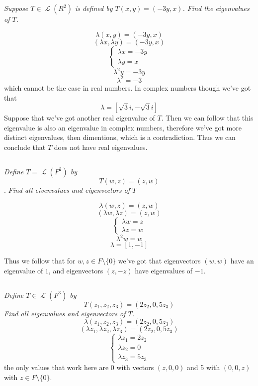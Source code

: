 \documentclass[11pt,oneside,titlepage]{book}
\DeclareMathOperator \map {\mathcal {L}}
\begin{document}
\subsection{}

\textit{Suppose $T \in \map(R^2)$ is defined by $T(x, y) = (-3y, x)$. Find the eigenvalues
  of $T$.}

$$\lambda (x, y) = (-3y, x)$$
$$ (\lambda x, \lambda y) = (-3y, x)$$
$$
\begin{cases}
  \lambda x = -3y \\
  \lambda y = x
\end{cases}
$$
$$\lambda^2 y = -3y $$
$$\lambda^2  = -3 $$
which cannot be the case in real numbers. In complex numbers though we've got that
$$\lambda = [\sqrt{3}i, -\sqrt{3}i]$$
Suppose that we've got another real eigenvalue of $T$. Then we can follow that this
eigenvalue is also an eigenvalue in complex numbers, therefore we've got more distinct eigenvalues,
then dimentions, which is a contradiction. Thus we can conclude that $T$ does not
have real eigenvalues.

\subsection{}

\textit{Define $T = \map(F^2)$ by}
$$T(w, z) = (z, w)$$.
\textit{Find all eivenvalues and eigenvectors of $T$}

$$\lambda (w, z) = (z, w)$$
$$ (\lambda w, \lambda z) = (z, w)$$
$$
\begin{cases}
  \lambda w = z \\
  \lambda z = w
\end{cases}
$$
$$\lambda^2 w = w$$
$$\lambda = [1, -1]$$

Thus we follow that for $w, z \in F \setminus \{0\}$ we've got
that eigenvectors $(w, w)$ have an eigenvalue of $1$, and eigenvectors $(z, -z)$ have eigenvalues
of $-1$.

\subsection{}

\textit{Define $T \in \map(F^3)$ by}
$$T(z_1, z_2, z_3) = (2z_2, 0, 5z_3)$$
\textit{Find all eigenvalues and eigenvectors of $T$.}
$$\lambda (z_1, z_2, z_3) = (2z_2, 0, 5z_3)$$
$$ (\lambda z_1, \lambda z_2, \lambda z_3) = (2z_2, 0, 5z_3)$$
$$
\begin{cases}
  \lambda z_1 = 2 z_2 \\
  \lambda z_2 = 0 \\
  \lambda z_3 = 5z_3
\end{cases}
$$
the only values that work here are 0 with vectors $(z, 0, 0)$ and 5 with $(0, 0, z)$ with
$z \in F \setminus \{0\}$.
\end{document}
